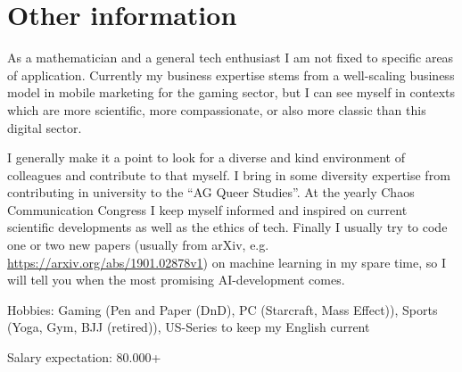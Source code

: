 \documentclass[a4paper]{twentysecondcv} %
\begin{document}

\section{Other information}
As a mathematician and a general tech enthusiast I am not fixed to specific areas of application.
Currently my business expertise stems from a well-scaling business model in mobile marketing for
the gaming sector, but I can see myself in contexts which are more scientific, more compassionate,
or also more classic than this digital sector. 

I generally make it a point to look for a diverse and kind environment of colleagues and 
contribute to that myself. I bring in some diversity expertise from contributing in university
to the ``AG Queer Studies''. At the yearly Chaos Communication Congress I keep 
myself informed and inspired on current scientific developments as well as the ethics of tech. 
Finally I usually try to code one or two new papers 
(usually from arXiv, e.g. \href{https://arxiv.org/abs/1901.02878v1}{https://arxiv.org/abs/1901.02878v1}) on machine 
learning in my spare time, so I will tell you when the most promising AI-development comes.

Hobbies: Gaming (Pen and Paper (DnD), PC (Starcraft, Mass Effect)), 
Sports (Yoga, Gym, BJJ (retired)), US-Series to keep my English current

Salary expectation: 80.000\EUR+
\end{document}
